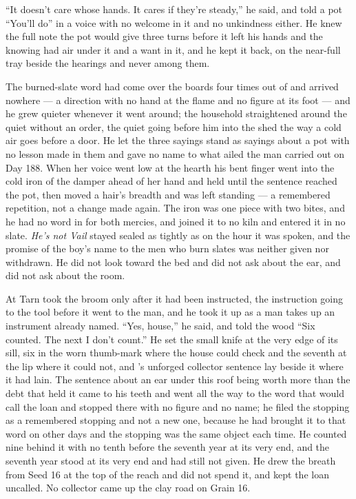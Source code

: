 “It doesn't care whose hands. It cares if they're steady,” he said, and told a pot “You'll do” in a voice with no welcome in it and no unkindness either. He knew the full note the pot would give three turns before it left his hands and the knowing had air under it and a want in it, and he kept it back, on the near-full tray beside the hearings and never among them.

The burned-slate word had come over the boards four times out of  and arrived nowhere --- a direction with no hand at the flame and no figure at its foot --- and he grew quieter whenever it went around; the household straightened around the quiet without an order, the quiet going before him into the shed the way a cold air goes before a door. He let the three sayings stand as sayings about a pot with no lesson made in them and gave no name to what ailed the man carried out on Day 188. When her voice went low at the hearth his bent finger went into the cold iron of the damper ahead of her hand and held until the sentence reached the pot, then moved a hair's breadth and was left standing --- a remembered repetition, not a change made again. The iron was one piece with two bites, and he had no word in  for both mercies, and joined it to no kiln and entered it in no slate. \emph{He's not Vail} stayed sealed as tightly as on the hour it was spoken, and the promise of the boy's name to the men who burn slates was neither given nor withdrawn. He did not look toward the bed and did not ask about the ear, and  did not ask about the room.

\scenebreak

At  Tarn took the broom only after it had been instructed, the instruction going to the tool before it went to the man, and he took it up as a man takes up an instrument already named. “Yes, house,” he said, and told the wood “Six counted. The next I don't count.” He set the small knife at the very edge of its sill, six in the worn thumb-mark where the house could check and the seventh at the lip where it could not, and 's unforged collector sentence lay beside it where it had lain. The sentence about an ear under this roof being worth more than the debt that held it came to his teeth and went all the way to the word that would call the loan and stopped there with no figure and no name; he filed the stopping as a remembered stopping and not a new one, because he had brought it to that word on other days and the stopping was the same object each time. He counted nine behind it with no tenth before the seventh year at its very end, and the seventh year stood at its very end and had still not given. He drew the breath from Seed 16 at the top of the reach and did not spend it, and kept the loan uncalled. No collector came up the clay road on Grain 16.

